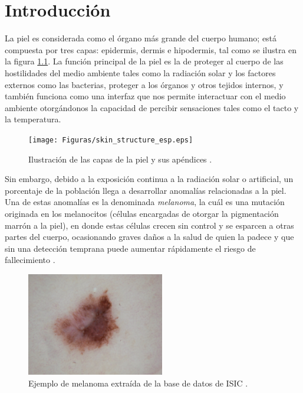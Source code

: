 
\doublespacing


\chapter{Introducción}

La piel es considerada como el órgano más grande del cuerpo humano; está compuesta por tres capas: epidermis, dermis e hipodermis, tal como se ilustra en la figura \ref{fig:skin1_jpg}. La función principal de la piel es la de proteger al cuerpo de las hostilidades del medio ambiente tales como la radiación solar y los factores externos como las bacterias, proteger a los órganos y otros tejidos internos, y también funciona como una interfaz que nos permite interactuar con el medio ambiente otorgándonos la capacidad de percibir sensaciones tales como el tacto y la temperatura.

\begin{figure}[h!]
    \texttt{[image: Figuras/skin\_structure\_esp.eps]}
    \centering
    \caption{Ilustración de las capas de la piel y sus apéndices \citep{skin_1}.}
    \label{fig:skin1_jpg}
\end{figure}

Sin embargo, debido a la exposición continua a la radiación solar o artificial, un porcentaje de la población llega a desarrollar anomalías relacionadas a la piel. Una de estas anomalías es la denominada \emph{melanoma}, la cuál es una mutación originada en los melanocitos (células encargadas de otorgar la pigmentación marrón a la piel), en donde estas células crecen sin control y se esparcen a otras partes del cuerpo, ocasionando graves daños a la salud de quien la padece y que sin una detección temprana puede aumentar rápidamente el riesgo de fallecimiento \citep{cancer_org}.

\begin{figure}[h!]
    \includegraphics[width=60mm]{Figuras/ISIC_0012591.jpg}
    \centering
    \caption{Ejemplo de melanoma extraída de la base de datos de ISIC \citep{isic_skin}.}
    \label{fig:can_jpg}
\end{figure}

